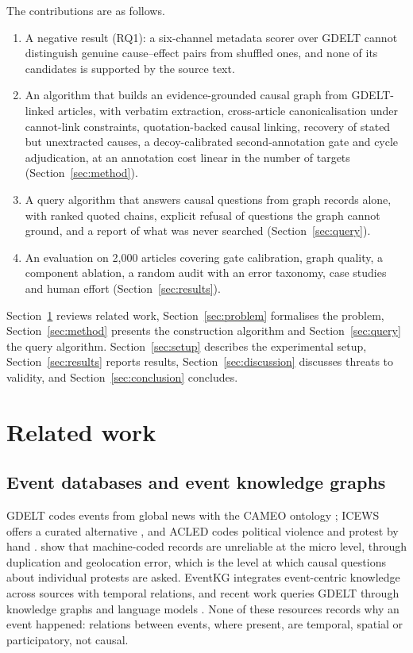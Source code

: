 \documentclass[pdflatex,sn-basic,lineno]{sn-jnl}
\theoremstyle{thmstylethree}
\theoremstyle{thmstyleone}
\begin{document}
The contributions are as follows.
\begin{enumerate}
\item A negative result (RQ1): a six-channel metadata scorer over GDELT cannot distinguish genuine
cause--effect pairs from shuffled ones, and none of its candidates is supported by the source text.
\item An algorithm that builds an evidence-grounded causal graph from GDELT-linked articles, with
verbatim extraction, cross-article canonicalisation under cannot-link constraints,
quotation-backed causal linking, recovery of stated but unextracted causes, a decoy-calibrated
second-annotation gate and cycle adjudication, at an annotation cost linear in the number of
targets (Section~\ref{sec:method}).
\item A query algorithm that answers causal questions from graph records alone, with ranked quoted
chains, explicit refusal of questions the graph cannot ground, and a report of what was never
searched (Section~\ref{sec:query}).
\item An evaluation on 2{,}000 articles covering gate calibration, graph quality, a component
ablation, a random audit with an error taxonomy, case studies and human effort
(Section~\ref{sec:results}).
\end{enumerate}

Section~\ref{sec:related} reviews related work, Section~\ref{sec:problem} formalises the problem,
Section~\ref{sec:method} presents the construction algorithm and Section~\ref{sec:query} the query
algorithm. Section~\ref{sec:setup} describes the experimental setup, Section~\ref{sec:results}
reports results, Section~\ref{sec:discussion} discusses threats to validity, and
Section~\ref{sec:conclusion} concludes.

\section{Related work}\label{sec:related}

\subsection{Event databases and event knowledge graphs}
GDELT codes events from global news with the CAMEO ontology \citep{gdelt,cameo}; ICEWS offers a
curated alternative \citep{icews}, and ACLED codes political violence and protest by hand
\citep{acled}. \citet{hammond} show that machine-coded records are unreliable
at the micro level, through duplication and geolocation error, which is the level at which causal
questions about individual protests are asked. EventKG \citep{eventkg} integrates event-centric
knowledge across sources with temporal relations, and recent work queries GDELT through knowledge
graphs and language models \citep{myers}. None of these resources records why an event happened:
relations between events, where present, are temporal, spatial or participatory, not causal.
\end{document}
